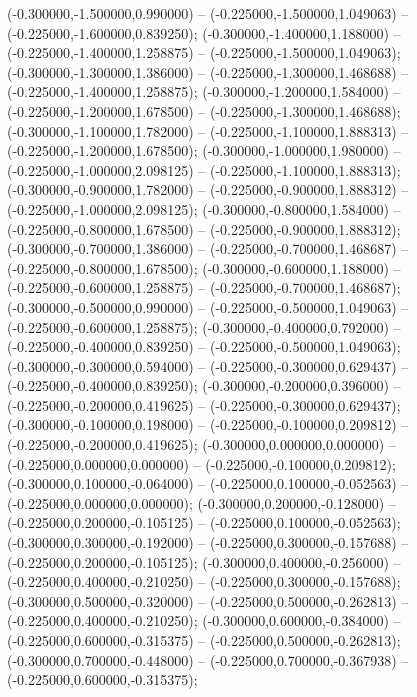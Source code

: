  (-0.300000,-1.500000,0.990000) -- (-0.225000,-1.500000,1.049063) -- (-0.225000,-1.600000,0.839250);
 (-0.300000,-1.400000,1.188000) -- (-0.225000,-1.400000,1.258875) -- (-0.225000,-1.500000,1.049063);
 (-0.300000,-1.300000,1.386000) -- (-0.225000,-1.300000,1.468688) -- (-0.225000,-1.400000,1.258875);
 (-0.300000,-1.200000,1.584000) -- (-0.225000,-1.200000,1.678500) -- (-0.225000,-1.300000,1.468688);
 (-0.300000,-1.100000,1.782000) -- (-0.225000,-1.100000,1.888313) -- (-0.225000,-1.200000,1.678500);
 (-0.300000,-1.000000,1.980000) -- (-0.225000,-1.000000,2.098125) -- (-0.225000,-1.100000,1.888313);
 (-0.300000,-0.900000,1.782000) -- (-0.225000,-0.900000,1.888312) -- (-0.225000,-1.000000,2.098125);
 (-0.300000,-0.800000,1.584000) -- (-0.225000,-0.800000,1.678500) -- (-0.225000,-0.900000,1.888312);
 (-0.300000,-0.700000,1.386000) -- (-0.225000,-0.700000,1.468687) -- (-0.225000,-0.800000,1.678500);
 (-0.300000,-0.600000,1.188000) -- (-0.225000,-0.600000,1.258875) -- (-0.225000,-0.700000,1.468687);
 (-0.300000,-0.500000,0.990000) -- (-0.225000,-0.500000,1.049063) -- (-0.225000,-0.600000,1.258875);
 (-0.300000,-0.400000,0.792000) -- (-0.225000,-0.400000,0.839250) -- (-0.225000,-0.500000,1.049063);
 (-0.300000,-0.300000,0.594000) -- (-0.225000,-0.300000,0.629437) -- (-0.225000,-0.400000,0.839250);
 (-0.300000,-0.200000,0.396000) -- (-0.225000,-0.200000,0.419625) -- (-0.225000,-0.300000,0.629437);
 (-0.300000,-0.100000,0.198000) -- (-0.225000,-0.100000,0.209812) -- (-0.225000,-0.200000,0.419625);
 (-0.300000,0.000000,0.000000) -- (-0.225000,0.000000,0.000000) -- (-0.225000,-0.100000,0.209812);
 (-0.300000,0.100000,-0.064000) -- (-0.225000,0.100000,-0.052563) -- (-0.225000,0.000000,0.000000);
 (-0.300000,0.200000,-0.128000) -- (-0.225000,0.200000,-0.105125) -- (-0.225000,0.100000,-0.052563);
 (-0.300000,0.300000,-0.192000) -- (-0.225000,0.300000,-0.157688) -- (-0.225000,0.200000,-0.105125);
 (-0.300000,0.400000,-0.256000) -- (-0.225000,0.400000,-0.210250) -- (-0.225000,0.300000,-0.157688);
 (-0.300000,0.500000,-0.320000) -- (-0.225000,0.500000,-0.262813) -- (-0.225000,0.400000,-0.210250);
 (-0.300000,0.600000,-0.384000) -- (-0.225000,0.600000,-0.315375) -- (-0.225000,0.500000,-0.262813);
 (-0.300000,0.700000,-0.448000) -- (-0.225000,0.700000,-0.367938) -- (-0.225000,0.600000,-0.315375);
